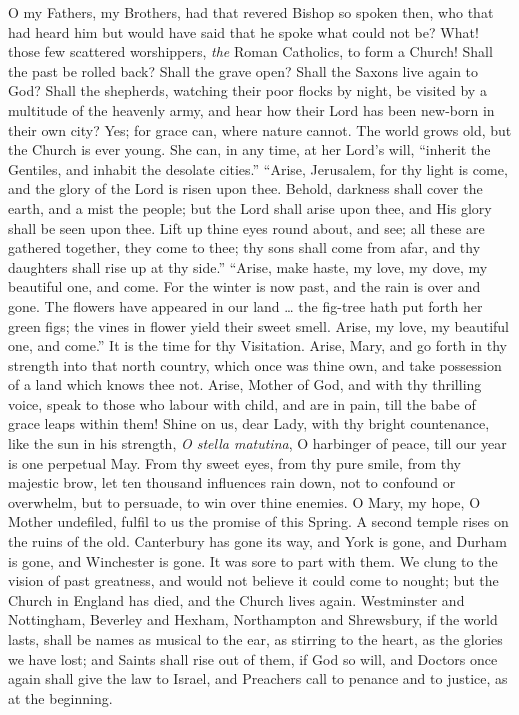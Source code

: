 O my Fathers, my Brothers, had that revered Bishop so
spoken then, who that had heard him but would have said
that he spoke what could not be? What! those few
scattered worshippers, \emph{the} Roman Catholics, to
form a Church! Shall the past be rolled back? Shall the
grave open? Shall the Saxons live again to God? Shall the
shepherds, watching their poor flocks by night, be
visited by a multitude of the heavenly army, and hear how
their Lord has been new-born in their own city? Yes; for
grace can, where nature cannot. The world grows old, but
the Church is ever young. She can, in any time, at her
Lord's will, ``inherit the Gentiles, and inhabit the
desolate cities.'' ``Arise, Jerusalem, for thy
light is come, and the glory of the Lord is risen upon
thee. Behold, darkness shall cover the earth, and a mist
the people; but the Lord shall arise upon thee, and His
glory shall be seen upon thee. Lift up thine eyes round
about, and see; all these are gathered together, they
come to thee; thy sons shall come from afar, and thy
daughters shall rise up at thy side.'' ``Arise,
make haste, my love, my dove, my beautiful one, and come.
For the winter is now past, and the rain is over and
gone. The flowers have appeared in our land … the
fig-tree hath put forth her green figs; the vines in
flower yield their sweet smell. Arise, my love, my
beautiful one, and come.'' It is the time for thy
Visitation. Arise, Mary, and go forth in thy strength
into that north country, which once was thine own, and
take possession of a land which knows thee not. Arise,
Mother of God, and with thy thrilling voice, speak to
those who labour with child, and are in pain, till the
babe of grace leaps within them! Shine on us, dear Lady,
with thy bright countenance, like the sun in his
strength, \emph{O stella matutina}, O harbinger of peace,
till our year is one perpetual May. From thy sweet eyes,
from thy pure smile, from thy majestic brow, let ten
thousand influences rain down, not to confound or
overwhelm, but to persuade, to win over thine enemies. O
Mary, my hope, O Mother undefiled, fulfil to us the
promise of this Spring. A second temple rises on the
ruins of the old. Canterbury has gone its way, and York
is gone, and Durham is gone, and Winchester is gone. It
was sore to part with them. We clung to the vision of
past greatness, and would not believe it could come to
nought; but the Church in England has died, and the
Church lives again. Westminster and Nottingham, Beverley
and Hexham, Northampton and Shrewsbury, if the world
lasts, shall be names as musical to the ear, as stirring
to the heart, as the glories we have lost; and Saints
shall rise out of them, if God so will, and Doctors once
again shall give the law to Israel, and Preachers call to
penance and to justice, as at the beginning.

